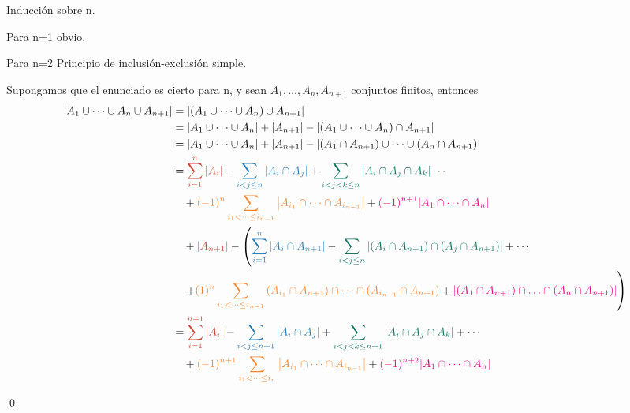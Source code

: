 		\begin{demostration}
		Inducción sobre n.
		
		Para n=1 obvio.
		
		Para n=2 Principio de inclusión-exclusión simple.
		
		Supongamos que el enunciado es cierto para n, y sean $A_1,\dotso,A_n,A_{n+1}$ conjuntos finitos, entonces
		\begin{align*}
			\abs{A_1\cup\dotsb\cup A_n\cup A_{n+1}}&=\abs{(A_1\cup\dotsb\cup A_n)\cup A_{n+1}} \\
			&=\abs{A_1\cup\dotsb\cup A_n}+\abs{A_{n+1}}-\abs{(A_1\cup\dotsb\cup A_n)\cap A_{n+1}} \\
			&=\abs{A_1\cup\dotsb\cup A_n}+\abs{A_{n+1}}-\abs{(A_1\cap A_{n+1})\cup\dotsb\cup(A_n\cap A_{n+1})}\\
			&= \textcolor{Rojop}{\sum_{i=1}^{n}{\abs{A_i}}}
			-\textcolor{Azulp}{\sum_{i< j\leq n}{\abs{A_i\cap A_j}}}
			+\textcolor{Verdep}{\sum_{i< j< k\leq n}{\abs{A_i\cap A_j\cap A_k}}}\dotsb\\
			&\quad+\textcolor{ORANGEmanim}{(-1)^n\sum_{i_1< \dotsb\leq i_{n-1}}{\abs{A_{i_1}\cap\dotsb\cap A_{i_{n-1}}}}}
			+\textcolor{magenta}{(-1)^{n+1}\abs{A_1\cap\dotsb\cap A_n}}\\
			&\quad+\textcolor{Rojop}{\abs{A_{n+1}}}
			-\left(\textcolor{Azulp}{\sum_{i=1}^{n}{\abs{A_i\cap A_{n+1}}}}
			-\textcolor{Verdep}{\sum_{i<j\le n}{\abs{(A_i\cap A_{n+1})\cap(A_j\cap A_{n+1})}}}+\dotsb\right.\\
			&\quad\left.+\textcolor{ORANGEmanim}{(1)^{n}\sum_{i_1<\dotsb\leq i_{n-1}}{(A_{i_1}\cap A_{n+1})\cap\dotsb\cap(A_{i_{n-1}}\cap A_{n+1})}}
			+\textcolor{magenta}{\abs{(A_1\cap A_{n+1})\cap\dotso\cap(A_n\cap A_{n+1})}}\right)\\
			&=\textcolor{Rojop}{\sum_{i=1}^{n+1}{\abs{A_i}}}
			-\textcolor{Azulp}{\sum_{i<j\le n+1}{\abs{A_i\cap A_j}}}
			+\textcolor{Verdep}{\sum_{i< j< k\leq n+1}{\abs{A_i\cap A_j\cap A_k}}}+\dotsb\\
			&\quad+\textcolor{ORANGEmanim}{(-1)^{n+1}\sum_{i_1< \dotsb\leq i_{n}}{\abs{A_{i_1}\cap\dotsb\cap A_{i_{n-1}}}}}
			+\textcolor{magenta}{(-1)^{n+2}\abs{A_1\cap\dotsb\cap A_n}}
		\end{align*}
		\begin{flushright}
			\qed
		\end{flushright}
	\end{demostration}
